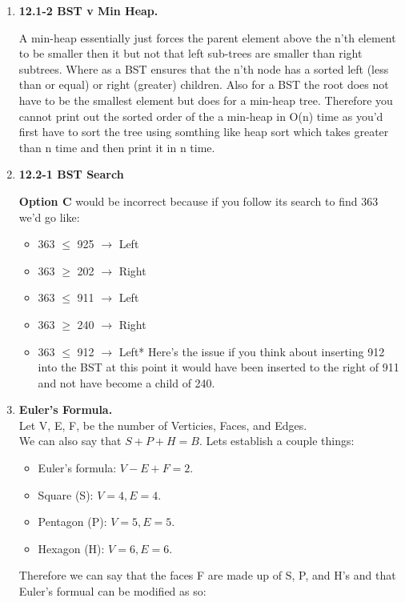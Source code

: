 \documentclass{article}
\begin{document}
\begin{enumerate}
    \item \textbf{12.1-2 BST v Min Heap.} 
    
    A min-heap essentially just forces the parent element above the n'th element to be smaller then it but not that left sub-trees are smaller than right subtrees. Where as a BST ensures that the n'th node has a sorted left (less than or equal) or right (greater) children. 
    Also for a BST the root does not have to be the smallest element but does for a min-heap tree. Therefore you cannot print out the sorted order of the a min-heap in O(n) time as you'd first have to sort the tree using somthing like heap sort which takes greater than n time and then print it in n time.

    \item \textbf{12.2-1 BST Search}
    
    \textbf{Option C} would be incorrect because if you follow its search to find 363 we'd go like:
    \begin{itemize}
      \item 363 $\leq$ 925 $\rightarrow$ Left
      \item 363 $\geq$ 202 $\rightarrow$ Right
      \item 363 $\leq$ 911 $\rightarrow$ Left
      \item 363 $\geq$ 240 $\rightarrow$ Right
      \item 363 $\leq$ 912 $\rightarrow$ Left* Here's the issue if you think about inserting 912 into the BST at this point it would have been inserted to the right of 911 and not have become a child of 240. 
    \end{itemize}

    \item \textbf{Euler's Formula.} \\
    
    Let V, E, F, be the number of Verticies, Faces, and Edges. \\
    We can also say that $S + P + H = B$.
    Lets establish a couple things: 
    \begin{itemize}
        \item Euler's formula: $V - E + F = 2$.
        \item Square (S): $V = 4, E = 4$.
        \item Pentagon (P): $V = 5, E = 5$.
        \item Hexagon (H): $V = 6, E = 6$.
    \end{itemize}

    Therefore we can say that the faces F are made up of S, P, and H's and that Euler's formual can be modified as so:


\end{enumerate}
\end{document}

